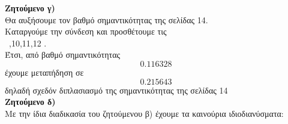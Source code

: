 \documentclass{article}
\newcommand{\lt}{\latintext}
\newcommand{\gt}{\greektext}
\begin{document}
\textbf{\gt Ζητούμενο γ)}\\
\gt Θα αυξήσουμε τον βαθμό σημαντικότητας της σελίδας 14.\\
\gt Καταργούμε την σύνδεση \lt14  και προσθέτουμε τις\\\
\lt9,10,11,12 .\\
\gt Έτσι, από βαθμό σημαντικότητας
\begin{equation*}
    0.116328
\end{equation*}
\gt έχουμε μεταπήδηση σε
\begin{equation*}
    0.215643
\end{equation*}
\gt δηλαδή σχεδόν διπλασιασμό της σημαντικότητας της σελίδας 14\\

\textbf{\gt Ζητούμενο δ)}\\
\gt Με την ίδια διαδικασία του ζητούμενου β) έχουμε τα καινούρια ιδιοδιανύσματα:
\end{document}
